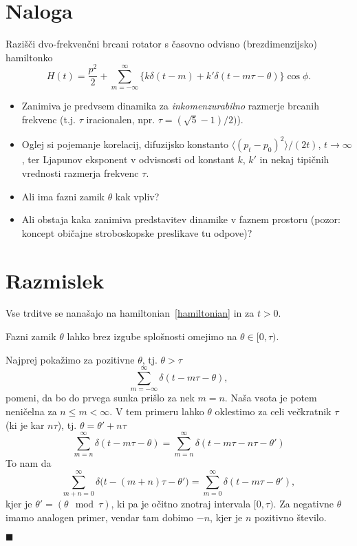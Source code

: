 \documentclass[a4paper, 12pt]{article}
\newenvironment{teorem}
{
	\vspace{6pt}
	\noindent [\emph{Trditev}]
}
{
	
}
\newenvironment{dokaz}
{
	\vspace{6pt}
	\noindent [\emph{Dokaz}]
}
{
	\begin{flushright}
		$\blacksquare$
	\end{flushright}
}
\begin{document}
\section{Naloga}

Razi\v s\v ci dvo-frekven\v cni brcani rotator s \v casovno odvisno (brezdimenzijsko) hamiltonko
\begin{equation}
	H(t) = \frac{p^2}{2} + \sum_{m = -\infty}^\infty \big\{k\delta(t - m) + k'\delta(t - m\tau - \theta)\big\}\cos\phi.
	\label{hamiltonian}
\end{equation}
\begin{itemize}
	\item{Zanimiva je predvsem dinamika za \emph{inkomenzurabilno} razmerje brcanih frekvenc (t.j. $\tau$ iracionalen,
		npr. $\tau = (\sqrt{5} - 1)/2)$).}
	\item{Oglej si pojemanje korelacij, difuzijsko konstanto $\langle(p_t - p_0)^2\rangle/(2t)$, $t \to \infty$, ter
		Ljapunov eksponent v odvisnosti od konstant $k$, $k'$ in nekaj tipi\v cnih vrednosti razmerja frekvenc
		$\tau$.}
	\item{Ali ima fazni zamik $\theta$ kak vpliv?}
	\item{Ali obstaja kaka zanimiva predstavitev dinamike v faznem prostoru (pozor: koncept obi\v cajne stroboskopske
		preslikave tu odpove)?}
\end{itemize}

\section{Razmislek}

Vse trditve se nana\v sajo na hamiltonian~\eqref{hamiltonian} in za $t > 0$.

\begin{teorem}
	Fazni zamik $\theta$ lahko brez izgube splo\v snosti omejimo na $\theta \in [0,\tau)$.
\end{teorem}

\begin{dokaz}
	Najprej poka\v zimo za pozitivne $\theta$, tj. $\theta > \tau$
	\begin{equation*}
		\sum_{m = -\infty}^\infty \delta (t - m\tau - \theta),
	\end{equation*}
	pomeni, da bo do prvega sunka pri\v slo za nek $m = n$. Na\v sa vsota je potem neni\v celna za
	$n \leq m < \infty$. V tem primeru lahko $\theta$ oklestimo za celi ve\v ckratnik
	$\tau$ (ki je kar $n\tau$), tj. $\theta = \theta' + n\tau$
	\[
		\sum_{m = n}^{\infty} \delta (t - m\tau - \theta) = \sum_{m = n}^\infty \delta (t - m\tau - n\tau - \theta')
	\]
	To nam da
	\[
		\sum_{m + n = 0}^\infty \delta \big(t - (m + n)\tau - \theta'\big) = \sum_{m = 0}^\infty
		\delta (t - m\tau - \theta'),
	\]
	kjer je $\theta' = (\theta \mod \tau)$, ki pa je o\v citno znotraj intervala $[0,\tau)$. Za negativne $\theta$ imamo
	analogen primer, vendar tam dobimo $-n$, kjer je $n$ pozitivno \v stevilo.
\end{dokaz}
\end{document}

